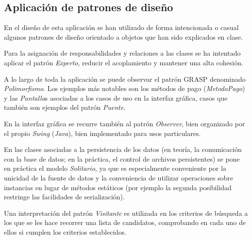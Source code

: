 \documentclass[11pt, a4paper, twoside, titlepage]{article}
\begin{document}
		\subsection{Aplicación de patrones de diseño}
En el diseño de esta aplicación \software se han utilizado de forma intencionada o casual algunos patrones de diseño orientado a objetos que han sido explicados en clase.

		Para la asignación de responsabilidades y relaciones a las clases se ha intentado aplicar el patrón \textit{Experto}, reducir el acoplamiento y 	mantener una alta cohesión.

		A lo largo de toda la aplicación se puede observar el patrón GRASP denominado \textit{Polimorfismo}. Los ejemplos más notables son los métodos de pago (\textit{MetodoPago}) y las \textit{Pantalla}s asociadas a los casos de uso en la interfaz gráfica, casos que también son ejemplos del patrón \textit{Puente}.

		En la interfaz gráfica se recurre también al patrón \textit{Observer}, bien organizado por el propio \textit{Swing} (\textit{Java}), bien implementado para usos particulares.

		En las clases asociadas a la persistencia de los datos (en teoría, la comunicación con la base de datos; en la práctica, el control de archivos persistentes) se pone en práctica el modelo \textit{Solitario}, ya que es especialmente conveniente por la unicidad de la fuente de datos y la conveniencia de utilizar operaciones sobre instancias en lugar de métodos estáticos (por ejemplo la segunda posibilidad restringe las facilidades de serialización).

		Una interpretación del patrón \textit{Visitante} es utilizada en los criterios de búsqueda a los que se les hace recorrer una lista de candidatos, comprobando en cada uno de ellos si cumplen los criterios establecidos.
\end{document}
